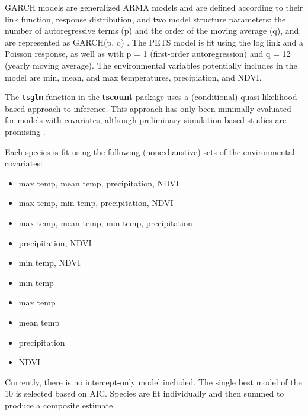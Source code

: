 \documentclass{article}
\def\code#1{\texttt{#1}}
\begin{document}
GARCH models are generalized ARMA models and are defined according to their link function, response distribution, and two model structure parameters: the number of autoregressive terms (p) and the order of the moving average (q), and are represented as GARCH(p, q) \cite{tscount}. The PETS model is fit using the log link and a Poisson response, as well as with p = 1 (first-order autoregression) and q = 12 (yearly moving average). The environmental variables potentially includes in the model are min, mean, and max temperatures, precipiation, and NDVI. 

The \code{tsglm} function in the \textbf{tscount} package \cite{tscount} uses a (conditional) quasi-likelihood based approach to inference. This approach has only been minimally evaluated for models with covariates, although preliminary simulation-based studies are promising \cite{tsglmvignette}.  

Each species is fit using the following (nonexhaustive) sets of the environmental covariates:
\begin{itemize}
\item max temp, mean temp, precipitation, NDVI
\item max temp, min temp, precipitation, NDVI
\item max temp, mean temp, min temp, precipitation
\item precipitation, NDVI
\item min temp, NDVI
\item min temp
\item max temp
\item mean temp
\item precipitation 
\item NDVI
\end{itemize}

Currently, there is no intercept-only model included. The single best model of the 10 is selected based on AIC. Species are fit individually and then summed to produce a composite estimate. 
\end{document}
